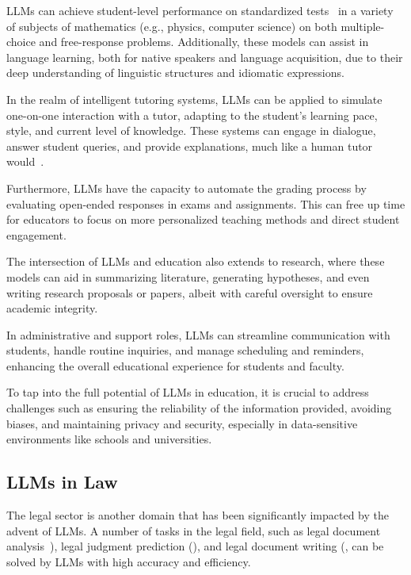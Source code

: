 LLMs can achieve student-level performance on standardized tests~\cite{openai2024gpt4} in a variety of subjects of mathematics (e.g., physics, computer science) on both multiple-choice and free-response problems.
Additionally, these models can assist in language learning, both for native speakers and language acquisition, due to their deep understanding of linguistic structures and idiomatic expressions.

In the realm of intelligent tutoring systems, LLMs can be applied to simulate one-on-one interaction with a tutor, adapting to the student's learning pace, style, and current level of knowledge.
These systems can engage in dialogue, answer student queries, and provide explanations, much like a human tutor would~\cite{malinka2023educationalimpact,susnjak2022chatgpt}.

Furthermore, LLMs have the capacity to automate the grading process by evaluating open-ended responses in exams and assignments.
This can free up time for educators to focus on more personalized teaching methods and direct student engagement.

The intersection of LLMs and education also extends to research, where these models can aid in summarizing literature, generating hypotheses, and even writing research proposals or papers, albeit with careful oversight to ensure academic integrity.

In administrative and support roles, LLMs can streamline communication with students, handle routine inquiries, and manage scheduling and reminders, enhancing the overall educational experience for students and faculty.

To tap into the full potential of LLMs in education, it is crucial to address challenges such as ensuring the reliability of the information provided, avoiding biases, and maintaining privacy and security, especially in data-sensitive environments like schools and universities.

\subsection{LLMs in Law}
\label{subsec:llms-in-law}


The legal sector is another domain that has been significantly impacted by the advent of LLMs.
A number of tasks in the legal field, such as legal document analysis~\cite{blairstanek2023gpt3statutory}), legal judgment prediction (\textcite{trautmann2022legalprompt}), and legal document writing (\textcite{choi2023chatgptlaw}, can be solved by LLMs with high accuracy and efficiency.

